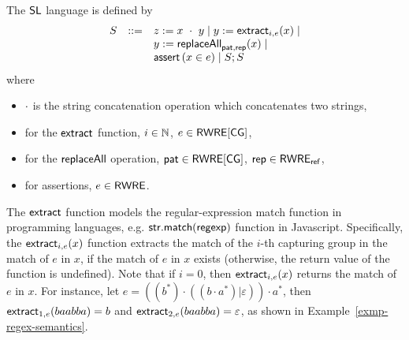 The $\mathsf{SL}$ language is defined by
\[
\begin{array}{l c l}
S &::= &  z:= x\ \cdot\ y \mid y := \mathsf{extract}_{i, e}(x) \mid  \\ 
& &  
y := \mathsf{replaceAll}_{\mathsf{pat}, \mathsf{rep}}(x)   \mid \\
& & \textsf{assert}\left(x \in e\right) \mid S; S\
\label{eq:SL}
\end{array}
\]
where 
\begin{itemize}
	\item $\cdot$ is the string concatenation operation which concatenates two strings,
%
\item for the $\mathsf{extract}$ function, $i \in \mathbb{N}$, $e \in {\sf RWRE}[\sf CG]$,
%
	\item  for the $\mathsf{replaceAll}$ operation, $\mathsf{pat}\in {\sf RWRE}[\sf CG]$, $\mathsf{rep} \in {\sf RWRE_{ref}}$, %
%
	\item for assertions, $e \in {\sf RWRE}$.
\end{itemize} 
%
%


%

The $\mathsf{extract}$ function models the regular-expression match function in programming languages, e.g. $\sf str.match(regexp)$ function in Javascript. Specifically, the $\mathsf{extract}_{i, e}(x)$ function extracts the match of the $i$-th capturing group in the match of $e$ in $x$, if the match of $e$ in $x$ exists (otherwise, the return value of the function is undefined). Note that if $i=0$, then $\mathsf{extract}_{i, e}(x)$ returns the match of $e$ in $x$. For instance, let $e = ((b^\ast) \cdot ((b \cdot a^\ast) | \varepsilon)) \cdot a^\ast$, then $\mathsf{extract}_{1, e}(baabba)=b$ and $\mathsf{extract}_{2, e}(baabba)=\varepsilon$, as shown in Example~\ref{exmp-regex-semantics}. 

